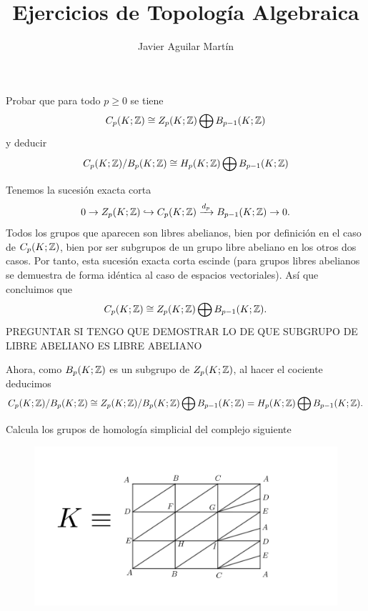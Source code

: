 \documentclass[twoside]{article}
\begin{document}
\title{Ejercicios de Topología Algebraica}
\author{Javier Aguilar Martín}
\maketitle

\begin{ejercicio}{1}
Probar que para todo $p\geq 0$ se tiene 
\[
C_p(K;\mathbb{Z})\cong Z_p(K;\mathbb{Z})\bigoplus B_{p-1}(K;\mathbb{Z})
\]
y deducir 
\[
C_p(K;\mathbb{Z})/B_p(K;\mathbb{Z})\cong H_p(K;\mathbb{Z})\bigoplus B_{p-1}(K;\mathbb{Z})
\]
\end{ejercicio}
\begin{solucion}
Tenemos la sucesión exacta corta
\[
0\to Z_p(K;\mathbb{Z})\hookrightarrow C_p(K;\mathbb{Z})\xrightarrow{d_p} B_{p-1}(K;\mathbb{Z})\to 0.
\]
Todos los grupos que aparecen son libres abelianos, bien por definición en el caso de $C_p(K;\mathbb{Z})$, bien por ser subgrupos de un grupo libre abeliano en los otros dos casos. Por tanto, esta sucesión exacta corta escinde (para grupos libres abelianos se demuestra de forma idéntica al caso de espacios vectoriales). Así que concluimos que 
\[
C_p(K;\mathbb{Z})\cong Z_p(K;\mathbb{Z})\bigoplus B_{p-1}(K;\mathbb{Z}).
\]
PREGUNTAR SI TENGO QUE DEMOSTRAR LO DE QUE SUBGRUPO DE LIBRE ABELIANO ES LIBRE ABELIANO

Ahora, como $B_p(K;\mathbb{Z})$ es un subgrupo de $Z_p(K;\mathbb{Z})$, al hacer el cociente deducimos
\[
C_p(K;\mathbb{Z})/B_p(K;\mathbb{Z})\cong Z_p(K;\mathbb{Z})/B_p(K;\mathbb{Z})\bigoplus B_{p-1}(K;\mathbb{Z})=H_p(K;\mathbb{Z})\bigoplus B_{p-1}(K;\mathbb{Z}).
\]
\end{solucion}

\newpage

\begin{ejercicio}{2}
Calcula los grupos de homología simplicial del complejo siguiente
\begin{figure}[h!]
\includegraphics[scale=0.8]{K}
\end{figure}
\end{ejercicio}
\end{document}
